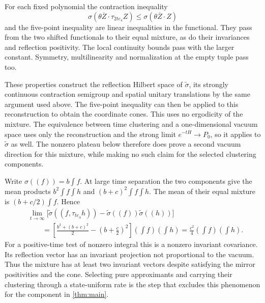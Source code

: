 \documentclass[11pt,letterpaper,reqno]{amsart}
\theoremstyle{definition}
\theoremstyle{remark}
\begin{document}
For each fixed polynomial the contraction inequality
\[
 \sigma(\theta\overline Z\cdot\tau_{2te_4}Z)
                         \le\sigma(\theta\overline Z\cdot Z)
\]
and the five-point inequality are linear
inequalities in the functional. They pass
from the two shifted functionals to their
equal mixture, as do their invariances
and reflection positivity. The local
continuity bounds pass with the larger
constant. Symmetry, multilinearity and
normalization at the empty tuple pass too.

These properties construct the reflection
Hilbert space of \(\widetilde\sigma\), its
strongly continuous contraction semigroup
and spatial unitary translations by the
same argument used above. The five-point
inequality can then be applied to this
reconstruction to obtain the coordinate
cones. This uses no ergodicity of the
mixture. The equivalence between time
clustering and a one-dimensional vacuum
space uses only the reconstruction and
the strong limit \(e^{-tH}\to P_0\), so
it applies to \(\widetilde\sigma\) as well.
The nonzero plateau below therefore does
prove a second vacuum direction for this
mixture, while making no such claim for
the selected clustering components.

Write $\sigma((f))=b\int f$. At large time separation the two
components give the mean products $b^2\int f\int h$ and
$(b+c)^2\int f\int h$. The mean of their equal mixture is
$(b+c/2)\int f$. Hence
\begin{align*}
 &\lim_{t\to\infty}
 \big[\widetilde\sigma((f,\tau_{te_4}h))
           -\widetilde\sigma((f))\widetilde\sigma((h))\big]\\
 &\qquad=
 \left[\frac{b^2+(b+c)^2}{2}
                       -\left(b+\frac c2\right)^2\right]
                         \left(\int f\right)\left(\int h\right)
 =\frac{c^2}{4}\left(\int f\right)\left(\int h\right).
\end{align*}
For a positive-time test of nonzero integral this is a nonzero
invariant covariance. Its reflection vector has an invariant
projection not proportional to the vacuum. Thus the mixture has
at least two invariant vectors despite satisfying the mirror
positivities and the cone. Selecting pure approximants and carrying
their clustering through a state-uniform rate is the step that
excludes this phenomenon for the component in \cref{thm:main}.
\end{document}
